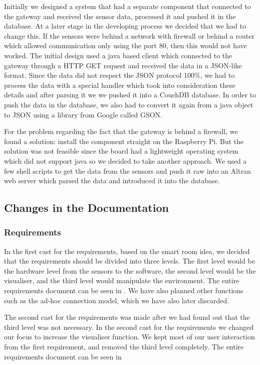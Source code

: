 \documentclass[../document.tex]{subfiles}
\begin{document}
Initially we designed a system that had a separate component that connected to the gateway and received the sensor data, processed it and pushed it in the database. At a later stage in the developing process we decided that we had to change this. If the sensors were behind a network with firewall or behind a router which allowed communication only using the port 80, then this would not have worked. The initial design used a java based client which connected to the gateway through a HTTP GET request and received the data in a \gls{JSON}-like format. Since the data did not respect the \gls{JSON} protocol 100\%, we had to process the data with a special handler which took into consideration these details and after parsing it we we pushed it into a CouchDB database. In order to push the data in the database, we also had to convert it again from a java object to \gls{JSON} using a library from Google called GSON. 

For the problem regarding the fact that the gateway is behind a firewall, we found a solution: install the component straight on the Raspberry Pi. But the solution was not feasible since the board had a lightweight operating system which did not support java so we decided to take another approach. We used a few shell scripts to get the data from the sensors and push it raw into an \gls{Altran} web server which parsed the data and introduced it into the database.

\subsection{Changes in the Documentation}

\subsubsection{Requirements}
In the first cast for the requirements, based on the smart room idea, we decided that the requirements should be divided into three levels. The first level would be the hardware level from the sensors to the software, the second level would be the visualiser, and the third level would manipulate the environment. The entire requirements document can be seen in . We have also planned other functions such as the ad-hoc connection model, which we have also later discarded. 

The second cast for the requirements was made after we had found out that the third level was not necessary. In the second cast for the requirements we changed our focus to increase the visualiser function. We kept most of our user interaction from the first requirement, and removed the third level completely. The entire requirements document can be seen in 
\end{document}
